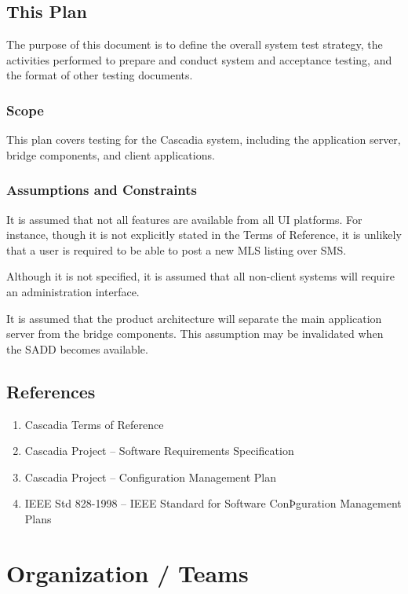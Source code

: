 \documentclass[11pt]{wacomepd}
\begin{document}
\section{This Plan}
The purpose of this document is to define the overall system test strategy, the activities performed
to prepare and conduct system and acceptance testing, and the format of other testing documents.

\subsection{Scope}
This plan covers testing for the Cascadia system, including the application server, bridge
components, and client applications.

\subsection{Assumptions and Constraints}
It is assumed that not all features are available from all UI platforms.  For instance, though it is
not explicitly stated in the Terms of Reference, it is unlikely that a user is required to be able
to post a new MLS listing over SMS.

Although it is not specified, it is assumed that all non-client systems will require an
administration interface.

It is assumed that the product architecture will separate the main application server from the
bridge components.  This assumption may be invalidated when the SADD becomes available.


\section{References}
\begin{enumerate}[1:]
\item Cascadia Terms of Reference
\item Cascadia Project -- Software Requirements Specification
\item Cascadia Project -- Configuration Management Plan
\item IEEE Std 828-1998 -- IEEE Standard for Software ConÞguration Management Plans
\end{enumerate}


\chapter{Organization / Teams}
\end{document}
